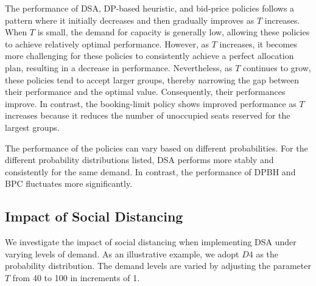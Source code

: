 The performance of DSA, DP-based heuristic, and bid-price policies follows a pattern where it initially decreases and then gradually improves as $T$ increases. When $T$ is small, the demand for capacity is generally low, allowing these policies to achieve relatively optimal performance. However, as $T$ increases, it becomes more challenging for these policies to consistently achieve a perfect allocation plan, resulting in a decrease in performance. Nevertheless, as $T$ continues to grow, these policies tend to accept larger groups, thereby narrowing the gap between their performance and the optimal value. Consequently, their performances improve. In contrast, the booking-limit policy shows improved performance as $T$ increases because it reduces the number of unoccupied seats reserved for the largest groups. 

The performance of the policies can vary based on different probabilities. For the different probability distributions listed, DSA performs more stably and consistently for the same demand. In contrast, the performance of DPBH and BPC fluctuates more significantly.


\subsection{Impact of Social Distancing}\label{impact_sd}
We investigate the impact of social distancing when implementing DSA under varying levels of demand. 
As an illustrative example, we adopt $D4$ as the probability distribution. The demand levels are varied by adjusting the parameter $T$ from 40 to 100 in increments of 1.



